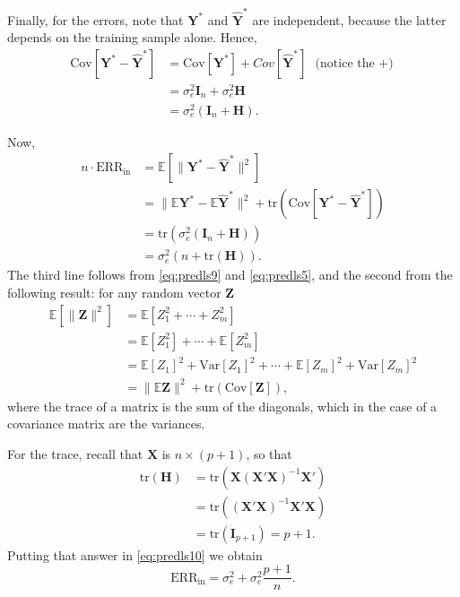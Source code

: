 \documentclass[
]{book}
\begin{document}
Finally, for the errors, note that \(\mathbf{Y}^{*}\) and \(\widehat{\mathbf{Y}}^{*}\) are independent, because the latter depends on the training sample alone. Hence,
\begin{align}
\text{Cov}[\mathbf{Y}^{*} - \widehat {\mathbf{Y}}^{*}] &= \text{Cov}[\mathbf{Y}^{*}] +Cov[\widehat {\mathbf{Y}}^{*}] ~~\mbox{(notice the $+$)}\\
&=\sigma^2_e\mathbf{I}_n+\sigma^2_e\mathbf{H}\\
&=\sigma^2_e(\mathbf{I}_n+\mathbf{H}).
\label{eq:predls9}
\end{align}

Now,
\begin{align}
n \cdot \text{ERR}_{\text{in}} &= \mathbb{E} [\|\mathbf{Y}^{*} - \widehat {\mathbf{Y}}^{*}\|^2]\\
&=\|\mathbb{E} \mathbf{Y}^{*} - \mathbb{E} \widehat {\mathbf{Y}}^{*} \|^2+ \text{tr}(\text{Cov}[\mathbf{Y}^{*} - \widehat {\mathbf{Y}}^{*}])\\
&=\text{tr} (\sigma^2_e(\mathbf{I}_n+\mathbf{H}))\\
&=\sigma^2_e(n+ \text{tr}(\mathbf{H})).
\label{eq:predls10}
\end{align}
The third line follows from \eqref{eq:predls9} and \eqref{eq:predls5}, and the second from the following result: for any random vector \(\mathbf{Z}\)
\begin{align}
\mathbb{E} [\|\mathbf{Z} \|^2] &= \mathbb{E} [Z_1^2+\cdots+Z_m^2]\\
&= \mathbb{E}[Z_1^2]+\cdots+\mathbb{E}[Z_m^2] \\
&= \mathbb{E}[Z_1]^2+\text{Var}[Z_1]^2+\cdots+\mathbb{E} [Z_m]^2+ \text{Var}[Z_m]^2\\
&= \|\mathbb{E} \mathbf{Z}\|^2 + \text{tr}(\text{Cov}[\mathbf{Z}]),
\label{eq:cov8}
\end{align}
where the trace of a matrix is the sum of the diagonals, which in the case of a
covariance matrix are the variances.

For the trace, recall that \(\mathbf{X}\) is \(n\times(p+1)\), so that
\begin{align}
\text{tr}(\mathbf{H}) &= \text{tr}(\mathbf{X}(\mathbf{X}'\mathbf{X})^{-1}\mathbf{X}') \\
&= \text{tr}((\mathbf{X}'\mathbf{X})^{-1}\mathbf{X}'\mathbf{X}) \\
&= \text{tr}(\mathbf{I}_{p+1})=p+1.
\label{eq:predls11}
\end{align}
Putting that answer in \eqref{eq:predls10} we obtain
\begin{equation}
\text{ERR}_{\text{in}} = \sigma^2_e + \sigma^2_e \frac{p+1}{n}.
\label{eq:predls12}
\end{equation}
\end{document}
